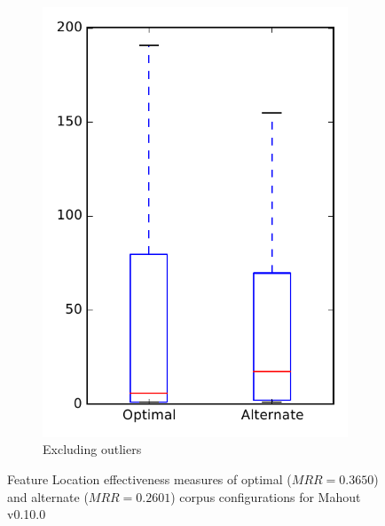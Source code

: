 \begin{figure}
\begin{subfigure}{.4\textwidth}
        \includegraphics[height=0.4\textheight]{figures/combo/flt_rq2_mahout_no_outlier}
        \caption{Excluding outliers}\label{fig:combo:flt:rq2:mahout_no_outlier}
    \end{subfigure}
\caption[Feature Location effectiveness measures of optimal and alternate corpus configurations for Mahout v0.10.0]%
{Feature Location effectiveness measures of optimal ($MRR=0.3650$) and alternate ($MRR=0.2601$) corpus configurations for Mahout v0.10.0}
\label{fig:combo:flt:rq2:mahout}
\end{figure}
